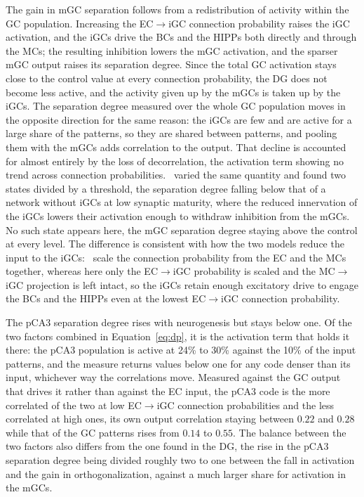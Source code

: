 The gain in mGC separation follows from a redistribution of activity within the GC population. Increasing the EC$\to$iGC
connection probability raises the iGC activation, and the iGCs drive the BCs and the HIPPs both directly and through the MCs; the
resulting inhibition lowers the mGC activation, and the sparser mGC output raises its separation degree. Since the total GC
activation stays close to the control value at every connection probability, the DG does not become less active, and the activity
given up by the mGCs is taken up by the iGCs. The separation degree measured over the whole GC population moves in the opposite
direction for the same reason: the iGCs are few and are active for a large share of the patterns, so they are shared between
patterns, and pooling them with the mGCs adds correlation to the output. That decline is accounted for almost entirely by the loss
of decorrelation, the activation term showing no trend across connection probabilities.\ \textcite{kimEffect2024} varied the same
quantity and found two states divided by a threshold, the separation degree falling below that of a network without iGCs at low
synaptic maturity, where the reduced innervation of the iGCs lowers their activation enough to withdraw inhibition from the mGCs.
No such state appears here, the mGC separation degree staying above the control at every level. The difference is consistent with
how the two models reduce the input to the iGCs:~\textcite{kimEffect2024} scale the connection probability from the EC and the MCs
together, whereas here only the EC$\to$iGC probability is scaled and the MC$\to$iGC projection is left intact, so the iGCs retain
enough excitatory drive to engage the BCs and the HIPPs even at the lowest EC$\to$iGC connection probability.

The pCA3 separation degree rises with neurogenesis but stays below one. Of the two factors combined in Equation~\ref{eq:dp}, it is
the activation term that holds it there: the pCA3 population is active at 24\% to 30\% against the 10\% of the input patterns, and
the measure returns values below one for any code denser than its input, whichever way the correlations move. Measured against the
GC output that drives it rather than against the EC input, the pCA3 code is the more correlated of the two at low EC$\to$iGC
connection probabilities and the less correlated at high ones, its own output correlation staying between $0.22$ and $0.28$ while
that of the GC patterns rises from $0.14$ to $0.55$. The balance between the two factors also differs from the one found in the
DG, the rise in the pCA3 separation degree being divided roughly two to one between the fall in activation and the gain in
orthogonalization, against a much larger share for activation in the mGCs.

